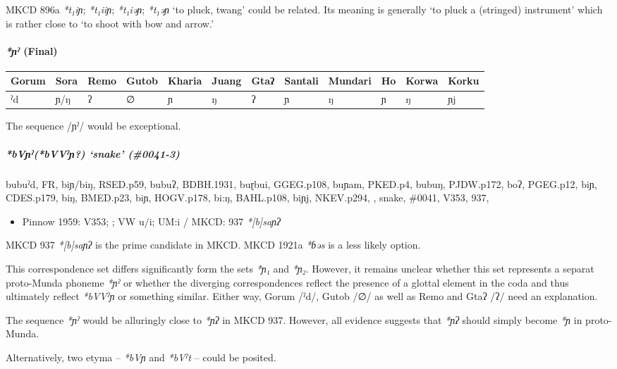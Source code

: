 \documentclass[a4paper,]{article}
\providecommand{\tightlist}{%
  \setlength{\itemsep}{0pt}\setlength{\parskip}{0pt}}
\let\oldparagraph\paragraph
\renewcommand{\paragraph}[1]{\oldparagraph{#1}\mbox{}}
\let\oldsubparagraph\subparagraph
\renewcommand{\subparagraph}[1]{\oldsubparagraph{#1}\mbox{}}
\begin{document}
MKCD 896a \emph{*t₁iɲ}; \emph{*t₁iiɲ}; \emph{*t₁iəɲ}; \emph{*t₁əɲ} `to
pluck, twang' could be related. Its meaning is generally `to pluck a
(stringed) instrument' which is rather close to `to shoot with bow and
arrow.'

\paragraph{\texorpdfstring{\emph{*ɲˀ}
(Final)}{*ɲˀ (Final)}}\label{ux272ux2c0-final}

\begin{longtable}[]{@{}llllllllllll@{}}
\toprule
Gorum & Sora & Remo & Gutob & Kharia & Juang & Gtaʔ & Santali & Mundari
& Ho & Korwa & Korku\tabularnewline
\midrule
\endhead
ˀd & ɲ/ŋ & ʔ & ∅ & ɲ & ŋ & ʔ & ɲ & ŋ & ɲ & ŋ & ɲj\tabularnewline
\bottomrule
\end{longtable}

The sequence /ɲˀ/ would be exceptional.

\subparagraph{\texorpdfstring{\emph{*bVɲˀ(*bVVˀɲ?)} `snake'
(\#0041-3)}{*bVɲˀ(*bVVˀɲ?) snake (\#0041-3)}}\label{bvux272ux2c0bvvux2c0ux272-snake-0041-3}

bubuˀd, FR, biɲ/biŋ, RSED.p59, bubuʔ, BDBH.1931, buɽbui, GGEG.p108,
buɲam, PKED.p4, bubuŋ, PJDW.p172, boʔ, PGEG.p12, biɲ, CDES.p179, biŋ,
BMED.p23, biɲ, HOGV.p178, bi:ŋ, BAHL.p108, biɲj, NKEV.p294, , snake,
\#0041, V353, 937,

\begin{itemize}
\tightlist
\item
  Pinnow 1959: V353; ; VW u/i; UM:i / MKCD: 937 \emph{*{[}b{]}saɲʔ}
\end{itemize}

MKCD 937 \emph{*{[}b{]}saɲʔ} is the prime candidate in MKCD. MKCD 1921a
\emph{*ɓəs} is a less likely option.

This correspondence set differs significantly form the sets \emph{*ɲ₁}
and \emph{*ɲ₂}. However, it remains unclear whether this set represents
a separat proto-Munda phoneme \emph{*ɲˀ} or whether the diverging
correspondences reflect the presence of a glottal element in the coda
and thus ultimately reflect \emph{*bVVˀɲ} or something similar. Either
way, Gorum /ˀd/, Gutob /∅/ as well as Remo and Gtaʔ /ʔ/ need an
explanation.

The sequence \emph{*ɲˀ} would be alluringly close to \emph{*ɲʔ} in MKCD
937. However, all evidence suggests that \emph{*ɲʔ} should simply become
\emph{*ɲ} in proto-Munda.

Alternatively, two etyma -- \emph{*bVɲ} and \emph{*bVˀt} -- could be
posited.
\end{document}
